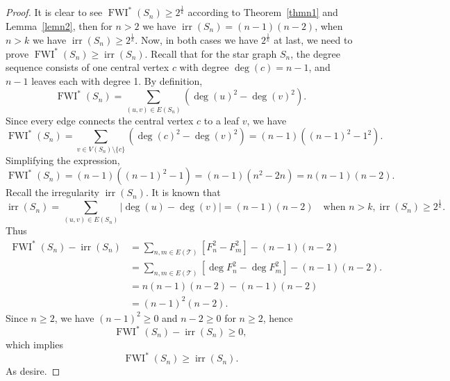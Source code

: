 \documentclass[12pt, a4paper]{article}
\begin{document}
\begin{proof}
It is clear to see $\operatorname{FWI}^*(S_n) \geqslant 2^{\frac{1}{k}}$ according to Theorem~\ref{thmn1} and Lemma~\ref{lemn2}, then for $n>2$ we have $\operatorname{irr}(S_n)=(n-1)(n-2)$, when $n>k$ we have $\operatorname{irr}(S_n)\geqslant 2^{\frac{1}{k}}$. 
Now, in both cases we have $2^{\frac{1}{k}}$ at last, we need to prove $\operatorname{FWI}^*(S_n) \geqslant \operatorname{irr}(S_n)$.
Recall that for the star graph $S_n$, the degree sequence consists of one central vertex $c$ with degree $\deg(c) = n-1$, and $n-1$ leaves each with degree 1. By definition,
\[
\operatorname{FWI}^*(S_n) = \sum_{(u,v) \in E(S_n)} \left( \deg(u)^2 - \deg(v)^2 \right).
\]
Since every edge connects the central vertex $c$ to a leaf $v$, we have
\[
\operatorname{FWI}^*(S_n) = \sum_{v \in V(S_n) \setminus \{c\}} \left( \deg(c)^2 - \deg(v)^2 \right) = (n-1) \left( (n-1)^2 - 1^2 \right).
\]
Simplifying the expression,
\[
\operatorname{FWI}^*(S_n) = (n-1) \left( (n-1)^2 - 1 \right) = (n-1)(n^2 - 2n) = n (n-1)(n-2).
\]
Recall the irregularity $\operatorname{irr}(S_n)$. It is known that
\[
\operatorname{irr}(S_n) = \sum_{(u,v) \in E(S_n)} |\deg(u) - \deg(v)| = (n-1)(n-2) \quad \text{when } n>k, \operatorname{irr}(S_n)\geqslant 2^{\frac{1}{k}}.
\]
Thus
\begin{align*}
  \operatorname{FWI}^*(S_n)-\operatorname{irr}(S_n)  &= \sum_{n,m\in E(\mathscr{T})}[ F_n^2-F_m^2] -(n-1)(n-2)\\
    &=\sum_{n,m\in E(\mathscr{T})}[ \deg F_n^2-\deg F_m^2] -(n-1)(n-2).\\
    &=n (n-1)(n-2) - (n-1)(n-2)\\
    &=(n-1)^2 (n-2).
\end{align*}
Since $n \geq 2$, we have $(n-1)^2 \geq 0$ and $n-2 \geq 0$ for $n \geq 2$, hence
\[
\operatorname{FWI}^*(S_n) - \operatorname{irr}(S_n) \geq 0,
\]
which implies
\[
\operatorname{FWI}^*(S_n) \geqslant \operatorname{irr}(S_n).
\]
As desire.
\end{proof}
\end{document}
